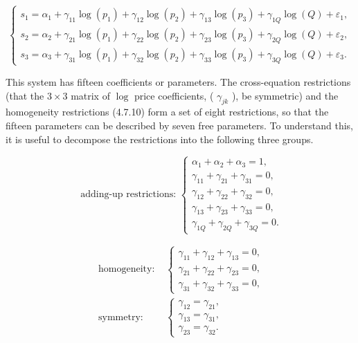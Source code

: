 \documentclass[10pt]{article}
\begin{document}
\[
\left\{\begin{array}{l}
s_{1}=\alpha_{1}+\gamma_{11} \log \left(p_{1}\right)+\gamma_{12} \log \left(p_{2}\right)+\gamma_{13} \log \left(p_{3}\right)+\gamma_{1 Q} \log (Q)+\varepsilon_{1},  \tag{4.7.11}\\
s_{2}=\alpha_{2}+\gamma_{21} \log \left(p_{1}\right)+\gamma_{22} \log \left(p_{2}\right)+\gamma_{23} \log \left(p_{3}\right)+\gamma_{2 Q} \log (Q)+\varepsilon_{2}, \\
s_{3}=\alpha_{3}+\gamma_{31} \log \left(p_{1}\right)+\gamma_{32} \log \left(p_{2}\right)+\gamma_{33} \log \left(p_{3}\right)+\gamma_{3 Q} \log (Q)+\varepsilon_{3} .
\end{array}\right.
\]

This system has fifteen coefficients or parameters. The cross-equation restrictions (that the $3 \times 3$ matrix of $\log$ price coefficients, ( $\gamma_{j k}$ ), be symmetric) and the homogeneity restrictions (4.7.10) form a set of eight restrictions, so that the fifteen parameters can be described by seven free parameters. To understand this, it is useful to decompose the restrictions into the following three groups.

\[
\text { adding-up restrictions: }\left\{\begin{array}{l}
\alpha_{1}+\alpha_{2}+\alpha_{3}=1,  \tag{4.7.12}\\
\gamma_{11}+\gamma_{21}+\gamma_{31}=0, \\
\gamma_{12}+\gamma_{22}+\gamma_{32}=0, \\
\gamma_{13}+\gamma_{23}+\gamma_{33}=0, \\
\gamma_{1 Q}+\gamma_{2 Q}+\gamma_{3 Q}=0 .
\end{array}\right.
\]


\begin{align*}
\text { homogeneity: } & \left\{\begin{array}{l}
\gamma_{11}+\gamma_{12}+\gamma_{13}=0, \\
\gamma_{21}+\gamma_{22}+\gamma_{23}=0, \\
\gamma_{31}+\gamma_{32}+\gamma_{33}=0,
\end{array}\right.  \tag{4.7.13}\\
\text { symmetry: } & \left\{\begin{array}{l}
\gamma_{12}=\gamma_{21}, \\
\gamma_{13}=\gamma_{31}, \\
\gamma_{23}=\gamma_{32} .
\end{array}\right. \tag{4.7.14}
\end{align*}
\end{document}
